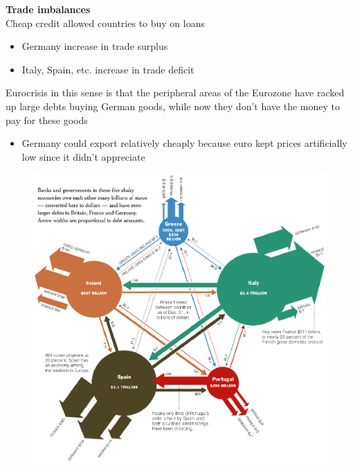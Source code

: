 \documentclass{beamer}
\begin{document}
\begin{frame}
  \textbf{Trade imbalances}\\
  Cheap credit allowed countries to buy on loans
  \begin{itemize}
    \item Germany increase in trade surplus
    \item Italy, Spain, etc. increase in trade deficit
  \end{itemize}
  \medskip
  Eurocrisis in this sense is that the peripheral areas of the Eurozone have racked up large debts buying German goods, while now they don't have the money to pay for these goods
  \begin{itemize}
    \item Germany could export relatively cheaply because euro kept prices artificially low since it didn't appreciate
  \end{itemize}
\end{frame}

\begin{frame}
  \begin{figure}
    \includegraphics[scale=.2]{debt_nyt.eps}
  \end{figure}
\end{frame}
\end{document}
